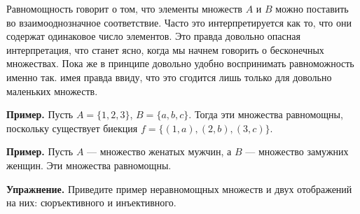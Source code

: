 Равномощность говорит о том, что элементы множеств $A$ и $B$ можно поставить во взаимооднозначное соответствие. Часто это интерпретируется как то, что они содержат одинаковое число элементов. Это правда довольно опасная интерпретация, что станет ясно, когда мы начнем говорить о бесконечных множествах. Пока же в принципе довольно удобно воспринимать равноможность именно так. имея  правда ввиду, что это сгодится лишь только для довольно маленьких множеств.

{\bfseries Пример.} Пусть $A = \{1, 2, 3\}$, $B = \{a, b, c\}$. Тогда эти множества равномощны, поскольку существует биекция $f=\{(1, a), (2, b) , (3, c)\}$.

{\bfseries Пример.} Пусть $A$ — множество женатых мужчин, а $B$ — множество замужних женщин. Эти множества равномощны.

{\bfseries Упражнение.} Приведите пример неравномощных множеств и двух отображений на них: сюръективного и инъективного.
